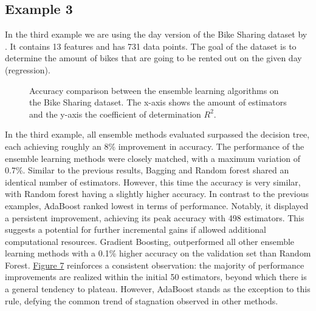 \newpage %
\subsection{Example 3}
In the third example we are using the day version of the Bike Sharing dataset by
\citet*{bike_sharing}. It contains 13 features and has 731 data 
points. The goal of the dataset is to determine the amount of bikes that are going
to be rented out on the given day (regression).



\begin{figure}[htbp]
    \centering
    \label{fig:bs_comparison}
    \caption{
        Accuracy comparison between the ensemble learning algorithms on the Bike Sharing dataset.
        The x-axis shows the amount of estimators and the y-axis the coefficient of determination $R^2$.
    }
\end{figure}

In the third example, all ensemble methods evaluated surpassed the decision tree, each achieving roughly an 8\% improvement in accuracy.
The performance of the ensemble learning methods were closely matched, with a maximum variation of 0.7\%.
Similar to the previous results, Bagging and Random forest shared an identical number of estimators. However, this time the 
accuracy is very similar, with Random forest having a slightly higher accuracy.
In contrast to the previous examples, AdaBoost ranked lowest in terms of performance. Notably, it displayed a persistent
improvement, achieving its peak accuracy with 498 estimators. This suggests a potential for further incremental gains if allowed
additional computational resources.
Gradient Boosting, outperformed all other ensemble learning methods with a 0.1\% higher accuracy on the validation set than Random
Forest.
\hyperref[fig:bs_comparison]{Figure 7} reinforces a consistent observation: the majority of performance improvements are realized
within the initial 50 estimators, beyond which there is a general tendency to plateau.
However, AdaBoost stands as the exception to this rule, defying the common trend of stagnation observed in other methods.


